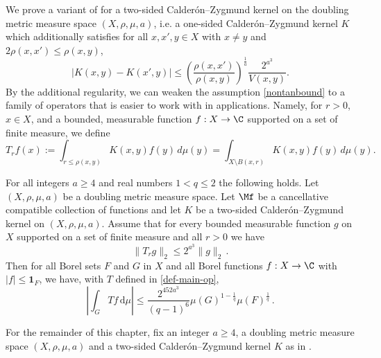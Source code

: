 We prove a variant of  for a two-sided Calder\'on--Zygmund kernel on the doubling metric measure space $(X,\rho,\mu,a)$, i.e. a one-sided Calder\'on--Zygmund kernel $K$ which additionally satisfies for all $x,x',y\in X$ with $x\neq y$ and $2\rho(x,x') \leq \rho(x,y)$,
\begin{equation}
    \label{eqkernel-x-smooth}
    |K(x,y) - K(x',y)| \leq \left(\frac{\rho(x,x')}{\rho(x,y)}\right)^{\frac{1}{a}}\frac{2^{a^3}}{V(x,y)}.
\end{equation}
By the additional regularity, we can weaken the assumption \eqref{nontanbound} to a family of operators that is easier to work with in applications.
Namely, for $r > 0$, $x\in X$, and a bounded, measurable function $f:X\to\C$ supported on a set of finite measure, we define
\begin{equation}
\label{def-T-r}
T_r f(x):= \int_{r\le\rho(x,y)} K(x,y) f(y) \, d\mu(y) = \int_{X\setminus B(x,r)} K(x,y) f(y) \, d\mu(y).
\end{equation}
\begin{theorem}
    \label{two-sided-metric-space-Carleson}
    \leanok
        For all  integers $a \ge  4$ and real numbers $1<q\le 2$
        the following holds.
        Let $(X,\rho,\mu,a)$ be a doubling metric measure space. Let  $\Mf$ be a
        cancellative compatible  collection of functions and let $K$ be a two-sided Calder\'on--Zygmund kernel on $(X,\rho,\mu,a)$. Assume  that for every bounded measurable function $g$ on $X$ supported on a set of finite measure and all $r>0$ we have
      \begin{equation}\label{two-sided-Hr-bound-assumption}
            \|T_r g\|_{2} \leq 2^{a^3} \|g\|_2\,.
        \end{equation}
        Then for all Borel sets $F$ and $G$ in $X$ and
        all Borel functions $f:X\to \C$ with
        $|f|\le \mathbf{1}_F$, we have, with $T$ defined in \eqref{def-main-op},
      \begin{equation}
        \label{two-sided-resweak}
            \left|\int_{G} T f \, \mathrm{d}\mu\right| \leq \frac{2^{452a^3}}{(q-1)^6} \mu(G)^{1-\frac{1}{q}} \mu(F)^{\frac{1}{q}}\, .
        \end{equation}
\end{theorem}

For the remainder of this chapter, fix an integer $a\ge 4$, a doubling metric measure space $(X,\rho,\mu,a)$ and a two-sided Calder\'on--Zygmund kernel $K$ as in .

